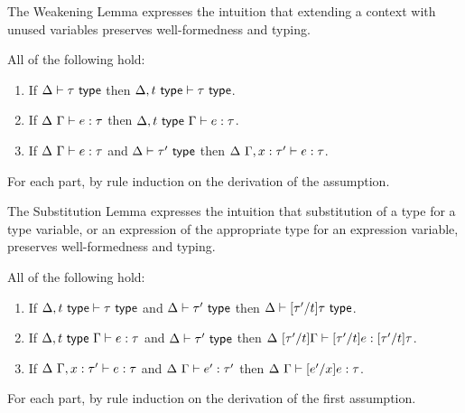 The Weakening Lemma expresses the intuition that extending a context with unused variables preserves well-formedness and typing.
\begin{lemma}[Weakening]\label{lemma:weakening-U} All of the following hold: 
\begin{enumerate} 
\item If $\Delta \vdash \tau~\mathsf{type}$ then $\Delta, t~\mathsf{type} \vdash \tau~\mathsf{type}$.
\item If $\Delta~\Gamma \vdash e : \tau$ then $\Delta, t~\mathsf{type}~\Gamma \vdash e : \tau$.
\item If $\Delta~\Gamma \vdash e : \tau$ and $\Delta \vdash \tau'~\mathsf{type}$ then $\Delta~\Gamma, x : \tau' \vdash e : \tau$.
\end{enumerate}
\end{lemma}
\begin{proof-sketch} For each part, by rule induction on the derivation of the assumption. 
\end{proof-sketch}

The Substitution Lemma expresses the intuition that substitution of a type for a type variable, or an expression of the appropriate type for an expression variable, preserves well-formedness and typing. 
\begin{lemma}[Substitution]\label{lemma:substitution-U} All of the following hold:
\begin{enumerate}
\item If $\Delta, t~\mathsf{type} \vdash \tau~\mathsf{type}$ and $\Delta \vdash \tau'~\mathsf{type}$ then $\Delta \vdash [\tau'/t]\tau~\mathsf{type}$.
\item If $\Delta, t~\mathsf{type}~\Gamma \vdash e : \tau$ and $\Delta \vdash \tau'~\mathsf{type}$ then $\Delta~[\tau'/t]\Gamma \vdash [\tau'/t]e : [\tau'/t]\tau$.
\item If $\Delta~\Gamma, x : \tau' \vdash e : \tau$ and $\Delta~\Gamma \vdash e' : \tau'$ then $\Delta~\Gamma \vdash [e'/x]e : \tau$.
\end{enumerate}\end{lemma}
\begin{proof-sketch}
For each part, by rule induction on the derivation of the first assumption.
\end{proof-sketch}

